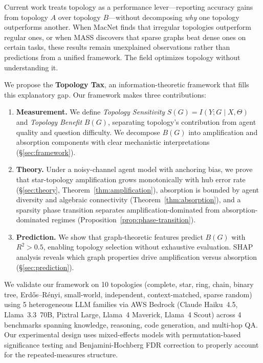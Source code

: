 \documentclass{article}
\begin{document}
Current work treats topology as a performance lever---reporting accuracy gains from topology $A$ over topology $B$---without decomposing \emph{why} one topology outperforms another. When MacNet finds that irregular topologies outperform regular ones, or when MASS discovers that sparse graphs beat dense ones on certain tasks, these results remain unexplained observations rather than predictions from a unified framework. The field optimizes topology without understanding it.

We propose the \textbf{Topology Tax}, an information-theoretic framework that fills this explanatory gap. Our framework makes three contributions:

\begin{enumerate}
    \item \textbf{Measurement.} We define \emph{Topology Sensitivity} $S(G) = I(Y; G \mid X, \Theta)$ and \emph{Topology Benefit} $B(G)$, separating topology's contribution from agent quality and question difficulty. We decompose $B(G)$ into amplification and absorption components with clear mechanistic interpretations (\S\ref{sec:framework}).

    \item \textbf{Theory.} Under a noisy-channel agent model with anchoring bias, we prove that star-topology amplification grows monotonically with hub error rate (\S\ref{sec:theory}, Theorem~\ref{thm:amplification}), absorption is bounded by agent diversity and algebraic connectivity (Theorem~\ref{thm:absorption}), and a sparsity phase transition separates amplification-dominated from absorption-dominated regimes (Proposition~\ref{prop:phase-transition}).

    \item \textbf{Prediction.} We show that graph-theoretic features predict $B(G)$ with $R^2 > 0.5$, enabling topology selection without exhaustive evaluation. SHAP analysis reveals which graph properties drive amplification versus absorption (\S\ref{sec:prediction}).
\end{enumerate}

We validate our framework on 10 topologies (complete, star, ring, chain, binary tree, Erd\H{o}s--R\'{e}nyi, small-world, independent, context-matched, sparse random) using 5 heterogeneous LLM families via AWS Bedrock (Claude Haiku~4.5, Llama~3.3~70B, Pixtral Large, Llama~4 Maverick, Llama~4 Scout) across 4 benchmarks spanning knowledge, reasoning, code generation, and multi-hop QA. Our experimental design uses mixed-effects models with permutation-based significance testing and Benjamini-Hochberg FDR correction to properly account for the repeated-measures structure.
\end{document}
